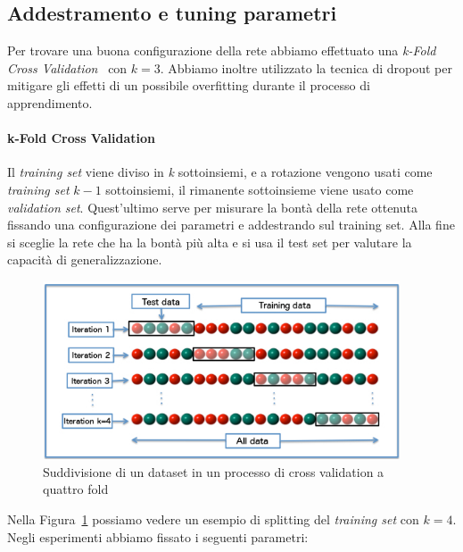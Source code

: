 \documentclass[11pt,a4paper,twoside,
openright]{book}
\begin{document}
\subsection{Addestramento e tuning parametri}
\label{modselmnist}
Per trovare una buona configurazione della rete abbiamo effettuato una \textit{k-Fold Cross Validation}~\cite{Refaeilzadeh2009} con $k=3$. Abbiamo inoltre utilizzato la tecnica di dropout per mitigare gli effetti di un possibile overfitting durante il processo di apprendimento.
\paragraph*{k-Fold Cross Validation}
Il \textit{training set} viene diviso in \textit{k} sottoinsiemi, e a rotazione vengono usati come \textit{training set} $k-1$ sottoinsiemi, il rimanente sottoinsieme viene usato come \textit{validation set}. Quest'ultimo serve per misurare la bontà della rete ottenuta fissando una configurazione dei parametri e addestrando sul training set. Alla fine si sceglie la rete che ha la bontà più alta e si usa il test set per valutare la capacità di generalizzazione.
\begin{figure}
\begin{center}
\includegraphics[width=300pt]{K-fold_cross_validation_EN.jpg}
\caption{Suddivisione di un dataset in un processo di cross validation a quattro fold~\cite{pict_kfold}}\label{fig:kfold}
\end{center}
\end{figure}
Nella Figura~\ref{fig:kfold} possiamo vedere un esempio di splitting del \textit{training set} con $k=4$.\\
Negli esperimenti abbiamo fissato i seguenti parametri:
\end{document}
